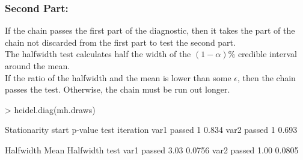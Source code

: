 \documentclass[handout]{beamer}
\begin{document}
\begin{frame}[fragile]
\frametitle{Second Part:}
\pause
If the chain passes the first part of the diagnostic, then it takes
the part of the chain not discarded from the first part to test the second part.\\
\bigskip
\pause
The halfwidth test calculates half the width of the $(1-\alpha)\%$
credible interval around the mean.  \\
\bigskip
\pause
If the ratio of the halfwidth and the mean is lower than some
$\epsilon$, then the chain passes the test.  Otherwise, the chain must
be run out longer.
\pause
\bigskip
\tiny
\begin{Schunk}
\begin{Sinput}
> heidel.diag(mh.draws)
\end{Sinput}
\begin{Soutput}
     Stationarity start     p-value
     test         iteration        
var1 passed       1         0.834  
var2 passed       1         0.693  
                             
     Halfwidth Mean Halfwidth
     test                    
var1 passed    3.03 0.0756   
var2 passed    1.00 0.0805   
\end{Soutput}
\end{Schunk}
\normalsize 
\end{frame}
\end{document}

